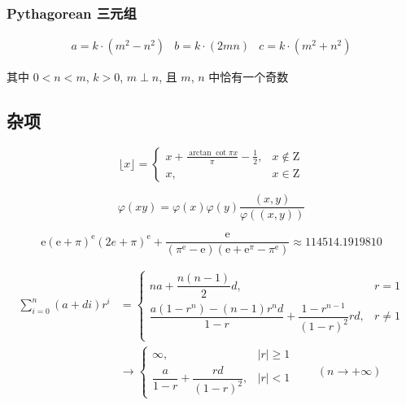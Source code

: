 \subsubsection{Pythagorean 三元组}

\[
    \begin{array}{ccc}
        a=k\cdot\left(m^2-n^2\right)&b=k\cdot\left(2mn\right)&c=k\cdot\left(m^2+n^2\right)
    \end{array}
\]

其中 \(0<n<m\), \(k>0\), \(m\perp n\), 且 \(m\), \(n\) 中恰有一个奇数

\subsection{杂项}

\begin{equation}
    \lfloor x\rfloor=\begin{cases}
        \displaystyle x+\frac{\arctan\cot\pi x}{\pi}-\frac{1}{2}, & x\notin\mathrm{Z} \\
        x,                                                        & x\in\mathrm{Z}
    \end{cases}
\end{equation}

\begin{equation}
    \varphi(xy)=\varphi(x)\varphi(y)\frac{(x,y)}{\varphi((x,y))}
\end{equation}

\begin{equation}
    \mathrm{e}(\mathrm{e}+\pi)^\mathrm{e}(2e + \pi)^\mathrm{e}+\frac{\mathrm{e}}{(\pi^\mathrm{e}-\mathrm{e})(\mathrm{e}+\mathrm{e}^\pi-\pi^\mathrm{e})}\approx 114514.1919810
\end{equation}

\begin{equation}
    \begin{aligned}
        \sum_{i=0}^n(a+di)r^i & =\begin{cases}
                                     na+\dfrac{n(n-1)}{2}d,                                        & r=1    \\
                                     \dfrac{a(1-r^n)-(n-1)r^nd}{1-r}+\dfrac{1-r^{n-1}}{(1-r)^2}rd, & r\ne 1 \\
                                 \end{cases} \\
                              & \to\begin{cases}
                                       \infty,                             & |r|\geq 1 \\
                                       \dfrac{a}{1-r}+\dfrac{rd}{(1-r)^2}, & |r|<1
                                   \end{cases}\qquad(n\to+\infty)
    \end{aligned}
\end{equation}
